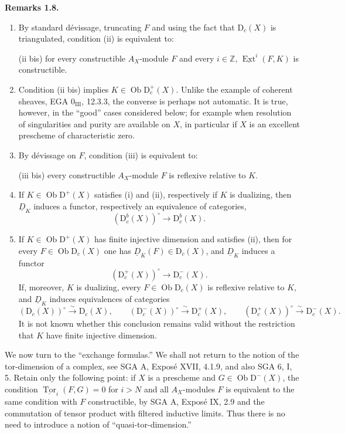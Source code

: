 \documentclass[12pt]{article}
\newcommand{\ZZ}{\mathbb Z}
\newcommand{\Ext}{\operatorname{Ext}}
\newcommand{\Tor}{\operatorname{Tor}}
\newcommand{\ob}{\operatorname{Ob}}
\newcommand{\D}{\mathrm D}
\newenvironment{statement}[1]{\par\medskip\noindent\textbf{#1.}\ }{\par\medskip}
\begin{document}
\begin{statement}{Remarks 1.8}
\begin{enumerate}[label=\alph*)]
\item By standard dévissage, truncating $F$ and using the fact that $\D_c(X)$ is triangulated, condition (ii) is equivalent to:

(ii bis) for every constructible $A_X$-module $F$ and every $i\in\ZZ$, $\underline{\Ext}^i(F,K)$ is constructible.

\item Condition (ii bis) implies $K\in\ob\D_c^+(X)$. Unlike the example of coherent sheaves, EGA $0_{\mathrm{III}}$, 12.3.3, the converse is perhaps not automatic. It is true, however, in the ``good'' cases considered below; for example when resolution of singularities and purity are available on $X$, in particular if $X$ is an excellent prescheme of characteristic zero.

\item By dévissage on $F$, condition (iii) is equivalent to:

(iii bis) every constructible $A_X$-module $F$ is reflexive relative to $K$.

\item If $K\in\ob\D^+(X)$ satisfies (i) and (ii), respectively if $K$ is dualizing, then $\underline D_K$ induces a functor, respectively an equivalence of categories,
\[
   (\D_c^b(X))^\circ\longrightarrow\D_c^b(X).
\]

\item If $K\in\ob\D^+(X)$ has finite injective dimension and satisfies (ii), then for every $F\in\ob\D_c(X)$ one has $\underline D_K(F)\in\D_c(X)$, and $\underline D_K$ induces a functor
\[
   (\D_c^+(X))^\circ\longrightarrow\D_c^-(X).
\]
If, moreover, $K$ is dualizing, every $F\in\ob\D_c(X)$ is reflexive relative to $K$, and $\underline D_K$ induces equivalences of categories
\[
   (\D_c(X))^\circ\xrightarrow{\sim}\D_c(X),\qquad
   (\D_c^-(X))^\circ\xrightarrow{\sim}\D_c^+(X),\qquad
   (\D_c^+(X))^\circ\xrightarrow{\sim}\D_c^-(X).
\]
It is not known whether this conclusion remains valid without the restriction that $K$ have finite injective dimension.
\end{enumerate}
\end{statement}

We now turn to the ``exchange formulas.'' We shall not return to the notion of the tor-dimension of a complex, see SGA A, Exposé XVII, 4.1.9, and also SGA 6, I, 5. Retain only the following point: if $X$ is a prescheme and $G\in\ob\D^-(X)$, the condition $\underline{\Tor}_i(F,G)=0$ for $i>N$ and all $A_X$-modules $F$ is equivalent to the same condition with $F$ constructible, by SGA A, Exposé IX, 2.9 and the commutation of tensor product with filtered inductive limits. Thus there is no need to introduce a notion of ``quasi-tor-dimension.''
\end{document}
